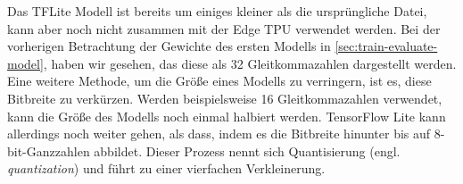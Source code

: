 Das TFLite Modell ist bereits um einiges kleiner als die ursprüngliche Datei,
kann aber noch nicht zusammen mit der Edge TPU verwendet werden.
Bei der vorherigen Betrachtung der Gewichte des ersten Modells
in \autoref{sec:train-evaluate-model}, haben wir gesehen, das
diese als \qty{32}{\bit} Gleitkommazahlen dargestellt werden.
Eine weitere Methode, um die Größe eines Modells zu verringern,
ist es, diese Bitbreite zu verkürzen.
Werden beispielsweise \qty{16}{\bit} Gleitkommazahlen verwendet,
kann die Größe des Modells noch einmal halbiert werden.
TensorFlow Lite kann allerdings noch weiter gehen, als dass, indem es die
Bitbreite hinunter bis auf 8-bit-Ganzzahlen abbildet.
Dieser Prozess nennt sich Quantisierung
(engl. \textit{quantization}) und führt zu einer vierfachen Verkleinerung.